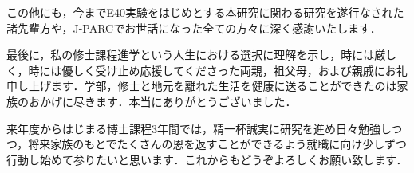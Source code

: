 この他にも，今までE40実験をはじめとする本研究に関わる研究を遂行なされた諸先輩方や，J-PARCでお世話になった全ての方々に深く感謝いたします．

最後に，私の修士課程進学という人生における選択に理解を示し，時には厳しく，時には優しく受け止め応援してくださった両親，祖父母，および親戚にお礼申し上げます．学部，修士と地元を離れた生活を健康に送ることができたのは家族のおかげに尽きます．本当にありがとうございました．

来年度からはじまる博士課程3年間では，精一杯誠実に研究を進め日々勉強しつつ，将来家族のもとでたくさんの恩を返すことができるよう就職に向け少しずつ行動し始めて参りたいと思います．これからもどうぞよろしくお願い致します．


